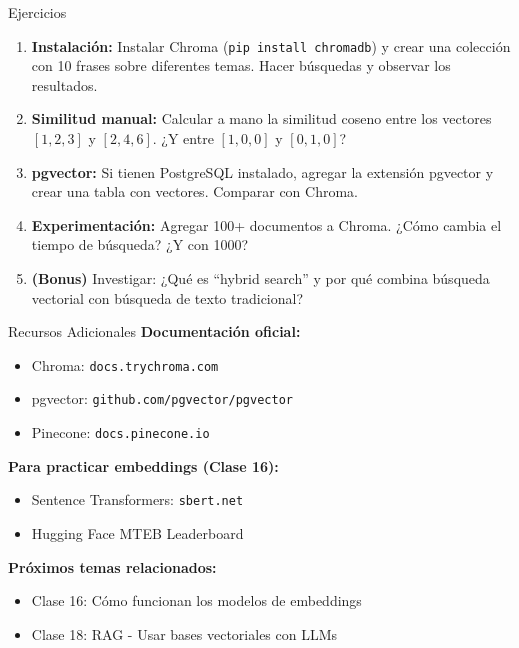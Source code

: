 \documentclass[aspectratio=169]{beamer}
\begin{document}
\begin{frame}{Ejercicios}
    \begin{enumerate}
        \setlength\itemsep{0.6em}
        \item \textbf{Instalación:} Instalar Chroma (\texttt{pip install chromadb}) y crear una colección con 10 frases sobre diferentes temas. Hacer búsquedas y observar los resultados.
        
        \item \textbf{Similitud manual:} Calcular a mano la similitud coseno entre los vectores $[1, 2, 3]$ y $[2, 4, 6]$. ¿Y entre $[1, 0, 0]$ y $[0, 1, 0]$?
        
        \item \textbf{pgvector:} Si tienen PostgreSQL instalado, agregar la extensión pgvector y crear una tabla con vectores. Comparar con Chroma.
        
        \item \textbf{Experimentación:} Agregar 100+ documentos a Chroma. ¿Cómo cambia el tiempo de búsqueda? ¿Y con 1000?
        
        \item \textbf{(Bonus)} Investigar: ¿Qué es ``hybrid search'' y por qué combina búsqueda vectorial con búsqueda de texto tradicional?
    \end{enumerate}
\end{frame}

\begin{frame}{Recursos Adicionales}
    \textbf{Documentación oficial:}
    \begin{itemize}
        \item Chroma: \texttt{docs.trychroma.com}
        \item pgvector: \texttt{github.com/pgvector/pgvector}
        \item Pinecone: \texttt{docs.pinecone.io}
    \end{itemize}
    
    \vspace{0.3cm}
    \textbf{Para practicar embeddings (Clase 16):}
    \begin{itemize}
        \item Sentence Transformers: \texttt{sbert.net}
        \item Hugging Face MTEB Leaderboard
    \end{itemize}
    
    \vspace{0.3cm}
    \textbf{Próximos temas relacionados:}
    \begin{itemize}
        \item Clase 16: Cómo funcionan los modelos de embeddings
        \item Clase 18: RAG - Usar bases vectoriales con LLMs
    \end{itemize}
\end{frame}
\end{document}
